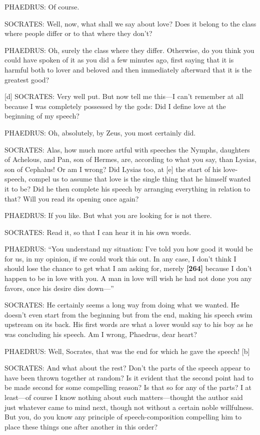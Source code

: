 PHAEDRUS: Of course.

SOCRATES: Well, now, what shall we say about love? Does it belong to the
class where people differ or to that where they don't?

PHAEDRUS: Oh, surely the class where they differ. Otherwise, do you
think you could have spoken of it as you did a few minutes ago, first
saying that it is harmful both to lover and beloved and then immediately
afterward that it is the greatest good?

{[}d{]} SOCRATES: Very well put. But now tell me this---I can't remember
at all because I was completely possessed by the gods: Did I define love
at the beginning of my speech?

PHAEDRUS: Oh, absolutely, by Zeus, you most certainly did.

SOCRATES: Alas, how much more artful with speeches the Nymphs, daughters
of Achelous, and Pan, son of Hermes, are, according to what you say,
than Lysias, son of Cephalus! Or am I wrong? Did Lysias too, at {[}e{]}
the start of his love-speech, compel us to assume that love is the
single thing that he himself wanted it to be? Did he then complete his
speech by arranging everything in relation to that? Will you read its
opening once again?

PHAEDRUS: If you like. But what you are looking for is not there.

SOCRATES: Read it, so that I can hear it in his own words.

PHAEDRUS: “You understand my situation: I've told you how good it would
be for us, in my opinion, if we could work this out. In any case, I
don't think I should lose the chance to get what I am asking for, merely
{\bf {[}264{]}} because I don't happen to be in love with you. A man in
love will wish he had not done you any favors, once his desire dies
down---”

SOCRATES: He certainly seems a long way from doing what we wanted. He
doesn't even start from the beginning but from the end, making his
speech swim upstream on its back. His first words are what a lover would
say to his boy as he was concluding his speech. Am I wrong, Phaedrus,
dear heart?

PHAEDRUS: Well, Socrates, that was the end for which he gave the speech!
{[}b{]}

SOCRATES: And what about the rest? Don't the parts of the speech appear
to have been thrown together at random? Is it evident that the second
point had to be made second for some compelling reason? Is that so for
any of the parts? I at least---of course I know nothing about such
matters---thought the author said just whatever came to mind next,
though not without a certain noble willfulness. But you, do you know any
principle of speech-composition compelling him to place these things one
after another in this order?

